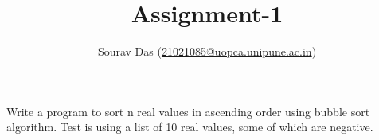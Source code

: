 \documentclass[11pt]{article} %
\title{Assignment-1}
\author{Sourav Das (\url{21021085@uopca.unipune.ac.in})}
\date{} %
\begin{document}
\maketitle

Write a program to sort n real values in ascending order using bubble sort algorithm. Test is using a list of 10 real values, some of which are negative.
\end{document}
